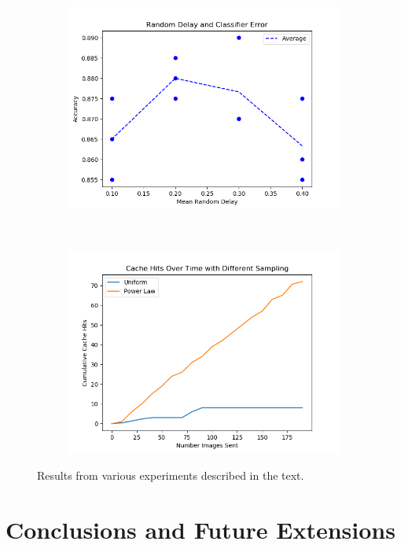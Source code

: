 \documentclass[12pt]{article}
\begin{document}
\begin{figure}
\begin{subfigure}{0.45\textwidth}
        \includegraphics[width=\textwidth]{plot_2_final.png}
    \end{subfigure}
    ~
    \begin{subfigure}{0.45\textwidth}
        \includegraphics[width=\textwidth]{cache_over_time.png}
    \end{subfigure}
    \caption{Results from various experiments described in the text.}
    \label{fig:results}
\end{figure}



\section{Conclusions and Future Extensions}
\end{document}
